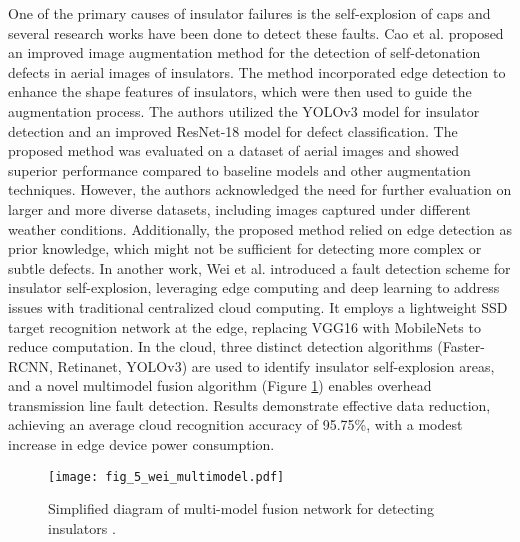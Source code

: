 One of the primary causes of insulator failures is the self-explosion of caps and several research works have been done to detect these faults. Cao et al. \cite{cao_accurate_2023} proposed an improved image augmentation method for the detection of self-detonation defects in aerial images of insulators. The method incorporated edge detection to enhance the shape features of insulators, which were then used to guide the augmentation process. The authors utilized the YOLOv3 model for insulator detection and an improved ResNet-18 model for defect classification. The proposed method was evaluated on a dataset of aerial images and showed superior performance compared to baseline models and other augmentation techniques. However, the authors acknowledged the need for further evaluation on larger and more diverse datasets, including images captured under different weather conditions. Additionally, the proposed method relied on edge detection as prior knowledge, which might not be sufficient for detecting more complex or subtle defects. In another work, Wei et al. \cite{wei_online_2022} introduced a fault detection scheme for insulator self-explosion, leveraging edge computing and deep learning to address issues with traditional centralized cloud computing. It employs a lightweight SSD target recognition network at the edge, replacing VGG16 with MobileNets to reduce computation. In the cloud, three distinct detection algorithms (Faster-RCNN, Retinanet, YOLOv3) are used to identify insulator self-explosion areas, and a novel multimodel fusion algorithm (Figure \ref{fig:wei_multimodel}) enables overhead transmission line fault detection. Results demonstrate effective data reduction, achieving an average cloud recognition accuracy of 95.75\%, with a modest increase in edge device power consumption.

\begin{figure}[htb]
    \centering
    \texttt{[image: fig\_5\_wei\_multimodel.pdf]}
    \caption{Simplified diagram of multi-model fusion network for detecting insulators \cite{wei_online_2022}.}
    \label{fig:wei_multimodel}
\end{figure}

